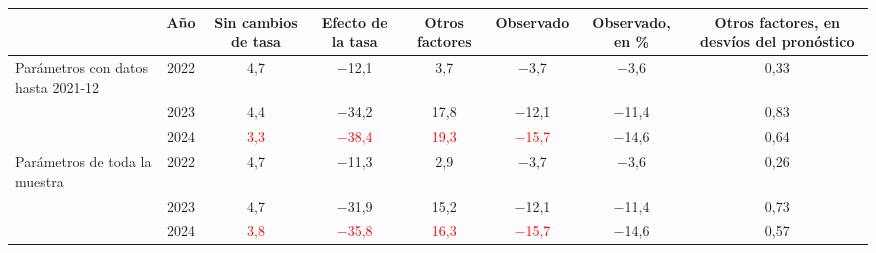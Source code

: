 \begin{tabular}{lccccccc}
\toprule
 & A\~no & Sin cambios de tasa & Efecto de la tasa & Otros factores & Observado & Observado, en \% & Otros factores, en desv\'ios del pron\'ostico
\\ \midrule
Par\'ametros con datos hasta 2021-12 & 2022 & 4{,}7 & \ensuremath{-}12{,}1 & 3{,}7 & \ensuremath{-}3{,}7 & \ensuremath{-}3{,}6 & 0{,}33 \\
 & 2023 & 4{,}4 & \ensuremath{-}34{,}2 & 17{,}8 & \ensuremath{-}12{,}1 & \ensuremath{-}11{,}4 & 0{,}83 \\
 & 2024 & \textcolor{red}{3{,}3} & \textcolor{red}{\ensuremath{-}38{,}4} & \textcolor{red}{19{,}3} & \textcolor{red}{\ensuremath{-}15{,}7} & \ensuremath{-}14{,}6 & 0{,}64 \\
Par\'ametros de toda la muestra & 2022 & 4{,}7 & \ensuremath{-}11{,}3 & 2{,}9 & \ensuremath{-}3{,}7 & \ensuremath{-}3{,}6 & 0{,}26 \\
 & 2023 & 4{,}7 & \ensuremath{-}31{,}9 & 15{,}2 & \ensuremath{-}12{,}1 & \ensuremath{-}11{,}4 & 0{,}73 \\
 & 2024 & \textcolor{red}{3{,}8} & \textcolor{red}{\ensuremath{-}35{,}8} & \textcolor{red}{16{,}3} & \textcolor{red}{\ensuremath{-}15{,}7} & \ensuremath{-}14{,}6 & 0{,}57 \\
\bottomrule
\end{tabular}
